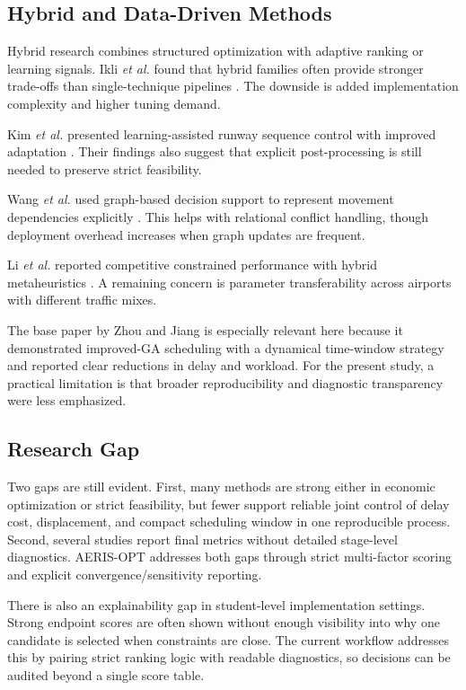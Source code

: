 \documentclass[conference]{IEEEtran}
\begin{document}
\subsection{Hybrid and Data-Driven Methods}
Hybrid research combines structured optimization with adaptive ranking or learning signals. Ikli \textit{et al.} found that hybrid families often provide stronger trade-offs than single-technique pipelines \cite{ref13}. The downside is added implementation complexity and higher tuning demand.

Kim \textit{et al.} presented learning-assisted runway sequence control with improved adaptation \cite{ref14}. Their findings also suggest that explicit post-processing is still needed to preserve strict feasibility.

Wang \textit{et al.} used graph-based decision support to represent movement dependencies explicitly \cite{ref15}. This helps with relational conflict handling, though deployment overhead increases when graph updates are frequent.

Li \textit{et al.} reported competitive constrained performance with hybrid metaheuristics \cite{ref16}. A remaining concern is parameter transferability across airports with different traffic mixes.

The base paper by Zhou and Jiang \cite{ref19} is especially relevant here because it demonstrated improved-GA scheduling with a dynamical time-window strategy and reported clear reductions in delay and workload. For the present study, a practical limitation is that broader reproducibility and diagnostic transparency were less emphasized.

\subsection{Research Gap}
Two gaps are still evident. First, many methods are strong either in economic optimization or strict feasibility, but fewer support reliable joint control of delay cost, displacement, and compact scheduling window in one reproducible process. Second, several studies report final metrics without detailed stage-level diagnostics. AERIS-OPT addresses both gaps through strict multi-factor scoring and explicit convergence/sensitivity reporting.

There is also an explainability gap in student-level implementation settings. Strong endpoint scores are often shown without enough visibility into why one candidate is selected when constraints are close. The current workflow addresses this by pairing strict ranking logic with readable diagnostics, so decisions can be audited beyond a single score table.
\end{document}
